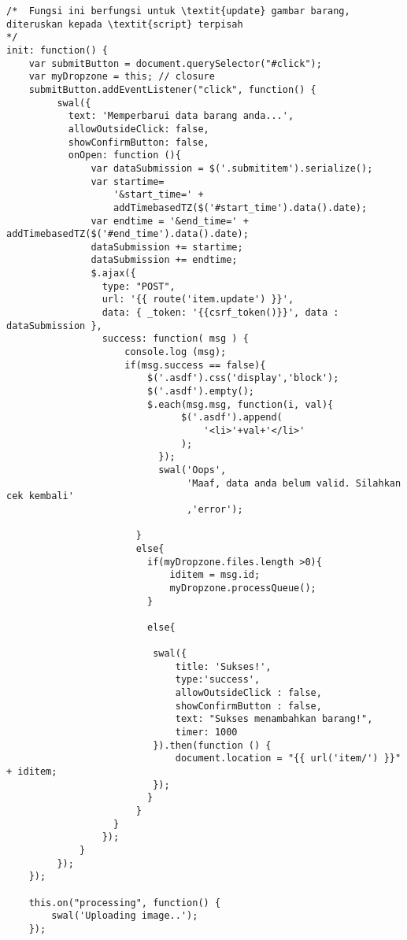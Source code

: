 \begin{lstlisting}[label=cdjq.03-02,style=htmlcssjs,caption=Implementasi \textit{View} Memperbarui Barang]
/*	Fungsi ini berfungsi untuk \textit{update} gambar barang, diteruskan kepada \textit{script} terpisah 
*/
init: function() {
    var submitButton = document.querySelector("#click");
    var myDropzone = this; // closure
	submitButton.addEventListener("click", function() {
		 swal({
		   text: 'Memperbarui data barang anda...',
		   allowOutsideClick: false,
		   showConfirmButton: false,
		   onOpen: function (){
		       var dataSubmission = $('.submititem').serialize();
		       var startime=
			       '&start_time=' + 
			       addTimebasedTZ($('#start_time').data().date);
		       var endtime = '&end_time=' + addTimebasedTZ($('#end_time').data().date);
		       dataSubmission += startime;
		       dataSubmission += endtime;
		       $.ajax({
		         type: "POST",
		         url: '{{ route('item.update') }}',
		         data: { _token: '{{csrf_token()}}', data : dataSubmission },
		         success: function( msg ) {
		             console.log (msg);
		             if(msg.success == false){
		                 $('.asdf').css('display','block');
		                 $('.asdf').empty();
		                 $.each(msg.msg, function(i, val){
		                       $('.asdf').append(
		                           '<li>'+val+'</li>'
		                       );
		                   });
		                   swal('Oops',
				                'Maaf, data anda belum valid. Silahkan cek kembali'
				                ,'error');
			
		               }
		               else{
		                 if(myDropzone.files.length >0){
		                     iditem = msg.id;
		                     myDropzone.processQueue();
		                 }
			
		                 else{
				
		                  swal({
		                      title: 'Sukses!',
		                      type:'success',
		                      allowOutsideClick : false,
		                      showConfirmButton : false,
		                      text: "Sukses menambahkan barang!",
		                      timer: 1000
		                  }).then(function () {
		                      document.location = "{{ url('item/') }}" + iditem;
		                  });
		                 }
		               }
		           }
		         });
		     }
		 });
	});

	this.on("processing", function() {
	    swal('Uploading image..');
	});


\end{lstlisting}
